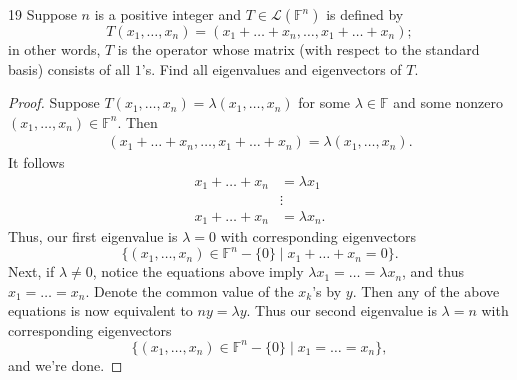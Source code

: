\documentclass{extarticle}
\newenvironment{problem}[1]{\begin{prob*}{#1}{}}{\end{prob*}}
\newcommand{\F}{\mathbb{F}}
\newcommand{\Hom}{\mathcal{L}}
\begin{document}
\begin{problem}{19}
Suppose $n$ is a positive integer and $T\in\Hom(\F^n)$ is defined by 
\begin{equation*}
T(x_1,\dots, x_n) = (x_1 + \dots + x_n, \dots, x_1 + \dots + x_n);
\end{equation*}
in other words, $T$ is the operator whose matrix (with respect to the standard basis) consists of all $1$'s.  Find all eigenvalues and eigenvectors of $T$.  
\end{problem}
\begin{proof}
Suppose $T(x_1,\dots,x_n) = \lambda(x_1,\dots, x_n)$ for some $\lambda\in\F$ and some nonzero $(x_1,\dots, x_n)\in\F^n$.  Then
\begin{align*}
(x_1 + \dots + x_n, \dots, x_1 + \dots + x_n) = \lambda(x_1,\dots, x_n).
\end{align*}
It follows 
\begin{align*}
x_1 + \dots + x_n &= \lambda x_1\\
&\vdots \\
x_1 + \dots + x_n &= \lambda x_n.
\end{align*}
Thus, our first eigenvalue is $\lambda = 0$ with corresponding eigenvectors 
\begin{equation*}
\{(x_1,\dots,x_n)\in\F^n-\{0\}\mid x_1+\dots + x_n = 0\}.  
\end{equation*}
Next, if $\lambda\neq 0$, notice the equations above imply $\lambda x_1 = \dots = \lambda x_n$, and thus $x_1 = \dots = x_n$.  Denote the common value of the $x_k$'s by $y$.  Then any of the above equations is now equivalent to $ny = \lambda y$.  Thus our second eigenvalue is $\lambda = n$ with corresponding eigenvectors 
\begin{equation*}
\{(x_1,\dots, x_n)\in\F^n-\{0\}\mid x_1=\dots=x_n\},
\end{equation*}
and we're done.
\end{proof}
\end{document}
